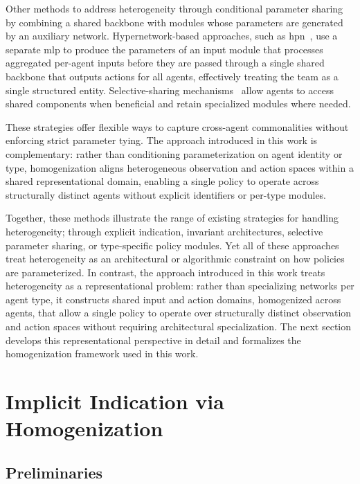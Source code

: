 \documentclass[]{jair}
\begin{document}
Other methods to address heterogeneity through conditional parameter sharing by
combining a shared backbone with modules whose parameters are generated 
by an auxiliary network. Hypernetwork-based approaches, such as 
\gls{hpn}~\cite{hao2023}, use a separate \gls{mlp} to produce the 
parameters of an input module that processes aggregated per-agent inputs 
before they are passed through a single shared backbone that outputs actions 
for all agents, effectively treating the team as a single structured entity. 
Selective-sharing mechanisms~\cite{christianos2021} allow agents to 
access shared components when beneficial and retain specialized modules where needed. 

These strategies offer flexible ways to capture cross-agent commonalities without 
enforcing strict parameter tying. The approach introduced in this work is complementary: 
rather than conditioning parameterization on agent identity or type, 
homogenization aligns heterogeneous observation and action spaces within a 
shared representational domain, enabling a single policy to operate across 
structurally distinct agents without explicit identifiers or per-type modules.

Together, these methods illustrate the range of existing strategies for 
handling heterogeneity; through explicit indication, invariant architectures, 
selective parameter sharing, or type-specific policy modules. 
Yet all of these approaches treat heterogeneity as an architectural or 
algorithmic constraint on how policies are parameterized. 
In contrast, the approach introduced in this work treats heterogeneity as a 
representational problem: rather than specializing networks per agent type, 
it constructs shared input and action domains, homogenized across agents,
that allow a single policy to operate over structurally distinct observation 
and action spaces without requiring architectural specialization.
The next section develops this representational perspective in detail and 
formalizes the homogenization framework used in this work.


\section{Implicit Indication via Homogenization}
\label{con2:sec:method_homogenization}

\subsection{Preliminaries}
\end{document}
